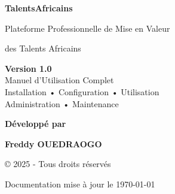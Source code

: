\documentclass[12pt,a4paper]{article}
\begin{document}
\newpage
\begin{center}
\vspace*{5cm}

{\Huge\bfseries\color{primarycolor} TalentsAfricains\par}

\vspace{1cm}

{\Large Plateforme Professionnelle de Mise en Valeur\par}
{\Large des Talents Africains\par}

\vspace{2cm}

\begin{tcolorbox}[colback=secondarycolor!20, colframe=secondarycolor, width=0.8\textwidth, arc=5mm]
\centering
\Large\textbf{Version 1.0}\\[0.5cm]
\normalsize
Manuel d'Utilisation Complet\\
Installation • Configuration • Utilisation\\
Administration • Maintenance
\end{tcolorbox}

\vspace{3cm}

{\large\bfseries Développé par\par}
\vspace{0.3cm}
{\LARGE\bfseries\color{primarycolor} Freddy OUEDRAOGO\par}

\vspace{1cm}

{\normalsize © 2025 - Tous droits réservés\par}
{\small Documentation mise à jour le \today\par}

\end{center}
\end{document}
